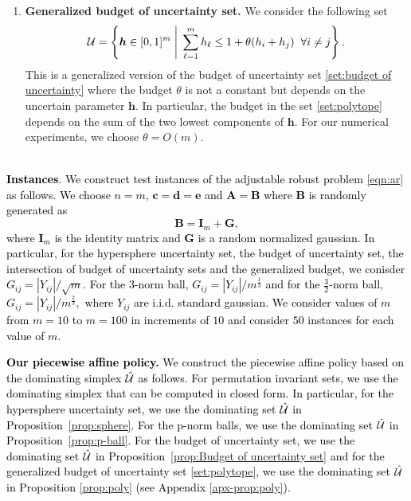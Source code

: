 \documentclass[11pt]{article}
\theoremstyle{plain}
\theoremstyle{definition}
\numberwithin{equation}{section}%
\numberwithin{equation}{section}%
\newcommand{\mb}[1]{\ensuremath{\boldsymbol{#1}}}
\newcommand*{\red}{\textcolor{black}}
\begin{document}
{\begin{enumerate}
(i.e. $ \mb\alpha_{i} = \vert \mb G_i \vert  / \vert \vert \mb G_i \vert\vert_2 $ where $\mb G_i $ are i.i.d. according to ${\cal N}(0, \mb I_m )$) and we consider $L=2$ and $L=5$.
\item {\bf Generalized budget of uncertainty set.} We consider the following set
\begin{equation} \label{set:polytope}
{\cal U}= \left\{ \mb h \in [0,1]^m \; \Bigg\vert \; \sum_{\ell=1}^m h_{\ell} \leq 1 + \theta ( h_i +h_j) \; \; \forall i \neq j \right\}.
\end{equation}
This is a generalized version of the budget of uncertainty set \eqref{set:budget of uncertainty} where the budget $\theta$ is not a constant but depends on the uncertain parameter $\mb h$. In particular, the budget in the set \eqref{set:polytope} depends on the sum of the two lowest components of $\mb h$. For our numerical experiments, we choose $\theta = O(m)$.
 \end{enumerate}
}

\vspace{2mm}
\noindent\\
\red{
{\bf Instances}. We construct test instances of the adjustable robust problem \eqref{eqn:ar} as follows. We choose $n=m$, $\mb c= \mb d = \mb e $ and $ \mb A= \mb B$ where $\mb B$ is  randomly generated as
\[ \mb B = \mb I_m + \mb G,\]
where $\mb I_m$ is the identity matrix and $\mb G$ is a random normalized gaussian. In particular, for the hypersphere  uncertainty set, the budget of uncertainty set,
 the intersection of budget of uncertainty sets and the generalized budget, we conisder $G_{ij} = |Y_{ij}|/ \sqrt{m}$. For the $3$-norm ball, $G_{ij} = |Y_{ij}|/ m^{\frac{1}{3}}$ and for the $\frac{3}{2}$-norm ball, $G_{ij} = |Y_{ij}|/ m^{\frac{2}{3}},$  where $Y_{ij}$ are i.i.d. standard gaussian. We consider values of $m$ from $m=10$ to $ m=100$ in increments of $10$ and consider $50$ instances for each value of $m$.
}

\vspace{2mm}
\noindent
\red{
{\bf Our piecewise affine policy.} We construct the piecewise affine policy based on the dominating simplex $\hat{\cal U}$ as follows. For permutation invariant sets, we use the dominating simplex that can be computed in closed form. In particular, for the hypersphere uncertainty set, we use the dominating set $\hat{\cal U}$  in Proposition~\ref{prop:sphere}. For the p-norm balls, we use the dominating set $\hat{\cal U}$ in Proposition~\ref{prop:p-ball}. For the  budget of uncertainty set, we use the dominating set $\hat{\cal U}$ in Proposition~\ref{prop:Budget of uncertainty set} and for the  generalized budget of uncertainty set \eqref{set:polytope}, we use the dominating set ${\hat{\cal U}}$ in Proposition \ref{prop:poly} (see Appendix \ref{apx-prop:poly}).}
\end{document}
